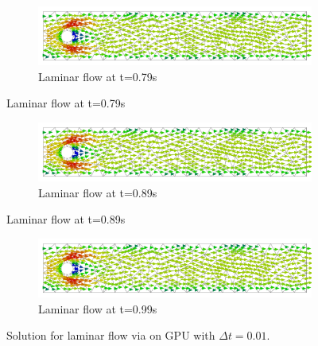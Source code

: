 \begin{figure}[H]
	\ContinuedFloat
	\begin{subfigure}{\textwidth}
    \includegraphics[width=\textwidth]{Figures/numerical_results/laminar_gpu/laminar_velocity_field_79.svg.pdf}
    \caption{Laminar flow at t=0.79s}
        \end{subfigure}
\end{figure}

\begin{figure}[H]
	\ContinuedFloat
	\begin{subfigure}{\textwidth}
    \includegraphics[width=\textwidth]{Figures/numerical_results/laminar_gpu/laminar_velocity_field_89.svg.pdf}
    \caption{Laminar flow at t=0.89s}
        \end{subfigure}
\end{figure}

\begin{figure}[H]
	\ContinuedFloat
	\begin{subfigure}{\textwidth}
    \includegraphics[width=\textwidth]{Figures/numerical_results/laminar_gpu/laminar_velocity_field_99.svg.pdf}
    \caption{Laminar flow at t=0.99s}
	\end{subfigure}
	\caption{Solution for laminar flow via  on GPU with $\Delta t = 0.01$.}
\end{figure}

